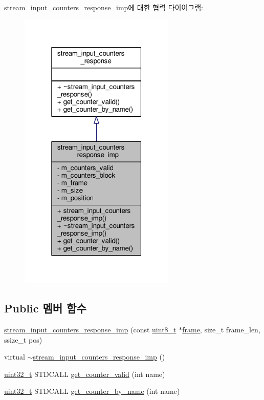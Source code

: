 stream\+\_\+input\+\_\+counters\+\_\+response\+\_\+imp에 대한 협력 다이어그램\+:
\nopagebreak
\begin{figure}[H]
\begin{center}
\leavevmode
\includegraphics[width=211pt]{classavdecc__lib_1_1stream__input__counters__response__imp__coll__graph}
\end{center}
\end{figure}
\subsection*{Public 멤버 함수}
\begin{DoxyCompactItemize}
\item 
\hyperlink{classavdecc__lib_1_1stream__input__counters__response__imp_af9be22beaa11c25c82ca177421e138c6}{stream\+\_\+input\+\_\+counters\+\_\+response\+\_\+imp} (const \hyperlink{stdint_8h_aba7bc1797add20fe3efdf37ced1182c5}{uint8\+\_\+t} $\ast$\hyperlink{gst__avb__playbin_8c_ac8e710e0b5e994c0545d75d69868c6f0}{frame}, size\+\_\+t frame\+\_\+len, ssize\+\_\+t pos)
\item 
virtual \hyperlink{classavdecc__lib_1_1stream__input__counters__response__imp_ae9c985a908edb995aa995e713c7a20ec}{$\sim$stream\+\_\+input\+\_\+counters\+\_\+response\+\_\+imp} ()
\item 
\hyperlink{parse_8c_a6eb1e68cc391dd753bc8ce896dbb8315}{uint32\+\_\+t} S\+T\+D\+C\+A\+LL \hyperlink{classavdecc__lib_1_1stream__input__counters__response__imp_a192c298bbf4dbeef7d3d88d892732455}{get\+\_\+counter\+\_\+valid} (int name)
\item 
\hyperlink{parse_8c_a6eb1e68cc391dd753bc8ce896dbb8315}{uint32\+\_\+t} S\+T\+D\+C\+A\+LL \hyperlink{classavdecc__lib_1_1stream__input__counters__response__imp_a5746c406e06afbbd5f35819f8e378476}{get\+\_\+counter\+\_\+by\+\_\+name} (int name)
\end{DoxyCompactItemize}
